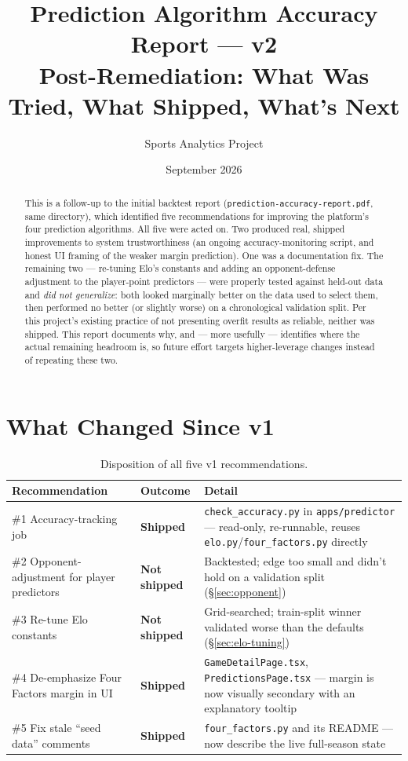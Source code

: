 \documentclass[11pt]{article}
\title{\textbf{Prediction Algorithm Accuracy Report — v2} \\ \large Post-Remediation: What Was Tried, What Shipped, What's Next}
\author{Sports Analytics Project}
\date{September 2026}
\newcommand{\code}[1]{\allowbreak\texttt{\small #1}\allowbreak}
\begin{document}
\maketitle

\begin{abstract}
\noindent This is a follow-up to the initial backtest report (\code{prediction-accuracy-report.pdf}, same
directory), which identified five recommendations for improving the platform's four prediction algorithms.
All five were acted on. Two produced real, shipped improvements to system trustworthiness (an ongoing
accuracy-monitoring script, and honest UI framing of the weaker margin prediction). One was a documentation
fix. The remaining two — re-tuning Elo's constants and adding an opponent-defense adjustment to the
player-point predictors — were properly tested against held-out data and \emph{did not generalize}: both
looked marginally better on the data used to select them, then performed no better (or slightly worse) on a
chronological validation split. Per this project's existing practice of not presenting overfit results as
reliable, neither was shipped. This report documents why, and — more usefully — identifies where the actual
remaining headroom is, so future effort targets higher-leverage changes instead of repeating these two.
\end{abstract}

\tableofcontents

\section{What Changed Since v1}

\begin{table}[h]
\centering
\small
\renewcommand{\arraystretch}{1.3}
\begin{tabular}{@{}>{\raggedright\arraybackslash}p{}>{\raggedright\arraybackslash}p{}>{\raggedright\arraybackslash}p{}@{}}
\toprule
Recommendation & Outcome & Detail \\
\midrule
\#1 Accuracy-tracking job & \textbf{Shipped} & \code{check\_accuracy.py} in \code{apps/predictor} — read-only, re-runnable, reuses \code{elo.py}/\code{four\_factors.py} directly \\
\#2 Opponent-adjustment for player predictors & \textbf{Not shipped} & Backtested; edge too small and didn't hold on a validation split (\S\ref{sec:opponent}) \\
\#3 Re-tune Elo constants & \textbf{Not shipped} & Grid-searched; train-split winner validated worse than the defaults (\S\ref{sec:elo-tuning}) \\
\#4 De-emphasize Four Factors margin in UI & \textbf{Shipped} & \code{GameDetailPage.tsx}, \code{PredictionsPage.tsx} — margin is now visually secondary with an explanatory tooltip \\
\#5 Fix stale ``seed data'' comments & \textbf{Shipped} & \code{four\_factors.py} and its README — now describe the live full-season state \\
\bottomrule
\end{tabular}
\caption{Disposition of all five v1 recommendations.}
\end{table}
\end{document}
